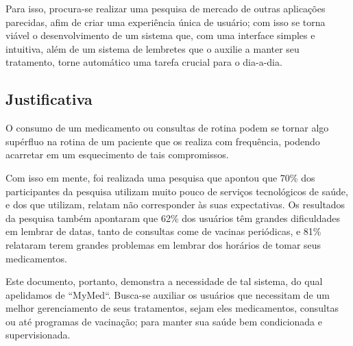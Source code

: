 \documentclass[
	article,			%
	12pt,				%
	oneside,			%
	a4paper,			%
    BIBLATEX,           %
	english,			%
	brazil,				%
	sumario=tradicional
	]{abntex2}
\newcommand\nomeprojeto{MyMed}
\begin{document}
Para isso, procura-se realizar uma pesquisa de mercado de outras aplicações parecidas, afim de criar uma experiência única de usuário; com isso se torna viável o desenvolvimento de um sistema que, com uma interface simples e intuitiva, além de um sistema de lembretes que o auxilie a manter seu tratamento, torne automático uma tarefa crucial para o dia-a-dia.


\subsection{Justificativa}    

O consumo de um medicamento ou consultas de rotina podem se tornar algo supérfluo na rotina de um paciente que os realiza com frequência, podendo acarretar em um esquecimento de tais compromissos.

Com isso em mente, foi realizada uma pesquisa que apontou que 70\% dos participantes da pesquisa utilizam muito pouco de serviços tecnológicos de saúde, e dos que utilizam, relatam não corresponder às suas expectativas. Os resultados da pesquisa também apontaram que 62\% dos usuários têm grandes dificuldades em lembrar de datas, tanto de consultas come de vacinas periódicas, e 81\% relataram terem grandes problemas em lembrar dos horários de tomar seus medicamentos.

Este documento, portanto, demonstra a necessidade de tal sistema, do qual apelidamos de ``\nomeprojeto``. Busca-se auxiliar os usuários que necessitam de um melhor gerenciamento de seus tratamentos, sejam eles medicamentos, consultas ou até programas de vacinação; para manter sua saúde bem condicionada e supervisionada.



\end{document}
